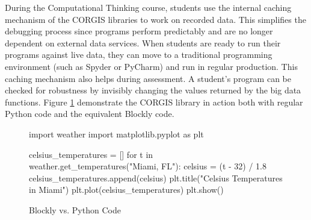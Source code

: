 During the Computational Thinking course, students use the internal caching mechanism of the CORGIS libraries to work on recorded data.
This simplifies the debugging process since programs perform predictably and are no longer dependent on external data services.
When students are ready to run their programs against live data, they can move to a traditional programming environment (such as Spyder or PyCharm) and run in regular production.
This caching mechanism also helps during assessment. A student's program can be checked for robustness by invisibly changing the values returned by the big data functions.
Figure \ref{fig-example-blockly} demonstrate the CORGIS library in action both with regular Python code and the equivalent Blockly code.

\begin{figure}
\caption{Blockly vs. Python Code}
\label{fig-example-blockly}
\centering
\begin{minipage}[b]{.75\linewidth}
\end{minipage}

\smallskip

\begin{minipage}[b]{.75\linewidth}
\begin{python}
import weather
import matplotlib.pyplot as plt

celsius_temperatures = []
for t in weather.get_temperatures("Miami, FL"):
	celsius = (t - 32) / 1.8
	celsius_temperatures.append(celsius)
plt.title("Celsius Temperatures in Miami")
plt.plot(celsius_temperatures)
plt.show()
\end{python}
\end{minipage}
\end{figure}

